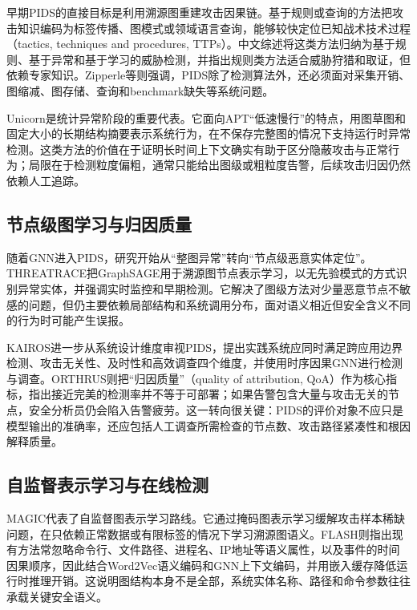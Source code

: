 早期PIDS的直接目标是利用溯源图重建攻击因果链。基于规则或查询的方法把攻击知识编码为标签传播、图模式或领域语言查询，能够较快定位已知战术技术过程（tactics, techniques and procedures, TTPs）。中文综述将这类方法归纳为基于规则、基于异常和基于学习的威胁检测，并指出规则类方法适合威胁狩猎和取证，但依赖专家知识\citep{leng2022review}。Zipperle等则强调，PIDS除了检测算法外，还必须面对采集开销、图缩减、图存储、查询和benchmark缺失等系统问题\citep{zipperle2023survey}。

Unicorn是统计异常阶段的重要代表。它面向APT“低速慢行”的特点，用图草图和固定大小的长期结构摘要表示系统行为，在不保存完整图的情况下支持运行时异常检测\citep{unicorn2020}。这类方法的价值在于证明长时间上下文确实有助于区分隐蔽攻击与正常行为；局限在于检测粒度偏粗，通常只能给出图级或粗粒度告警，后续攻击归因仍然依赖人工追踪。

\subsection{节点级图学习与归因质量}

随着GNN进入PIDS，研究开始从“整图异常”转向“节点级恶意实体定位”。THREATRACE把GraphSAGE用于溯源图节点表示学习，以无先验模式的方式识别异常实体，并强调实时监控和早期检测\citep{threatrace2022}。它解决了图级方法对少量恶意节点不敏感的问题，但仍主要依赖局部结构和系统调用分布，面对语义相近但安全含义不同的行为时可能产生误报。

KAIROS进一步从系统设计维度审视PIDS，提出实践系统应同时满足跨应用边界检测、攻击无关性、及时性和高效调查四个维度，并使用时序因果GNN进行检测与调查\citep{kairos2024}。ORTHRUS则把“归因质量”（quality of attribution, QoA）作为核心指标，指出接近完美的检测率并不等于可部署；如果告警包含大量与攻击无关的节点，安全分析员仍会陷入告警疲劳\citep{orthrus2025}。这一转向很关键：PIDS的评价对象不应只是模型输出的准确率，还应包括人工调查所需检查的节点数、攻击路径紧凑性和根因解释质量。

\subsection{自监督表示学习与在线检测}

MAGIC代表了自监督图表示学习路线。它通过掩码图表示学习缓解攻击样本稀缺问题，在只依赖正常数据或有限标签的情况下学习溯源图语义\citep{magic2024}。FLASH则指出现有方法常忽略命令行、文件路径、进程名、IP地址等语义属性，以及事件的时间因果顺序，因此结合Word2Vec语义编码和GNN上下文编码，并用嵌入缓存降低运行时推理开销\citep{flash2024}。这说明图结构本身不是全部，系统实体名称、路径和命令参数往往承载关键安全语义。

